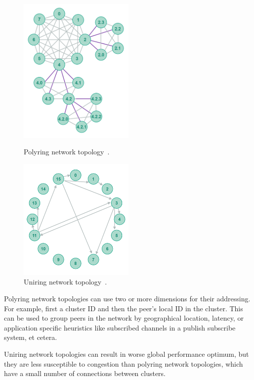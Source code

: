 \begin{figure}
	\centering
	\includegraphics[width=0.5\textwidth]{pictures/polyring.png}
	\caption{Polyring network topology~\cite{Jenkov_undated-kl}.}
	\label{Polyring}
	\includegraphics[width=0.5\textwidth]{pictures/uniring.png}
	\caption{Uniring network topology~\cite{Jenkov_undated-kl}.}
	\label{Uniring}
\end{figure}

Polyring network topologies can use two or more dimensions for their addressing. For example, first a cluster ID and then the peer's local ID in the cluster. This can be used to group peers in the network by geographical location, latency, or application specific heuristics like subscribed channels in a publish subscribe system, et cetera.

Uniring network topologies can result in worse global performance optimum, but they are less susceptible to congestion than polyring network topologies, which have a small number of connections between clusters.~\cite{Jenkov_undated-kl}


